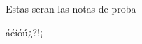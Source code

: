 \documentclass[12pt]{report}
\begin{document}
Estas seran las notas de proba

	áéíóú¿?!¡
\end{document}
